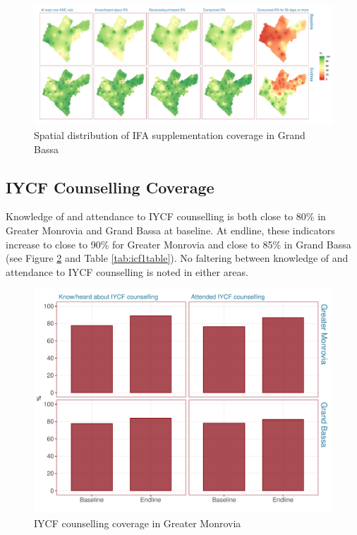 \documentclass[12pt,a4paper]{article}
\begin{document}
\begin{figure}[H]

{\centering \includegraphics{liberiaCoverageFinalReport_files/figure-latex/ifa2map-1} 

}

\caption{Spatial distribution of IFA supplementation coverage in Grand Bassa}\label{fig:ifa2map}
\end{figure}

\newpage

\hypertarget{iycf-counselling-coverage}{%
\subsection{IYCF Counselling Coverage}\label{iycf-counselling-coverage}}

Knowledge of and attendance to IYCF counselling is both close to 80\% in Greater Monrovia and Grand Bassa at baseline. At endline, these indicators increase to close to 90\% for Greater Monrovia and close to 85\% in Grand Bassa (see Figure \ref{fig:icf1plot} and Table \ref{tab:icf1table}). No faltering between knowledge of and attendance to IYCF counselling is noted in either areas.

\begin{figure}[H]

{\centering \includegraphics{liberiaCoverageFinalReport_files/figure-latex/icf1plot-1} 

}

\caption{IYCF counselling coverage in Greater Monrovia}\label{fig:icf1plot}
\end{figure}
\end{document}
